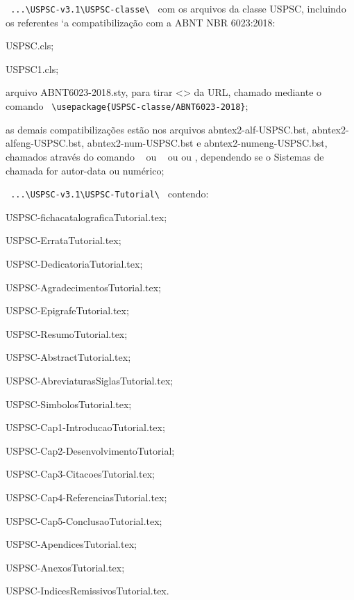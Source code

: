 \begin{alineas}
	\item \verb+ ...\USPSC-v3.1\USPSC-classe\ + com os arquivos da classe USPSC, incluindo os referentes `a compatibilização com a ABNT NBR 6023:2018:
		\begin{alineas}
			\item USPSC.cls;
			\item USPSC1.cls; 
			\item arquivo ABNT6023-2018.sty, para tirar <> da URL, chamado mediante o comando  \verb+ \usepackage{USPSC-classe/ABNT6023-2018}+;
			\item as demais compatibilizações estão nos arquivos abntex2-alf-USPSC.bst, abntex2-alfeng-USPSC.bst, abntex2-num-USPSC.bst e abntex2-numeng-USPSC.bst, chamados atrav\'es do comando \newline \verb+ + ou \newline
			\verb+ + ou \newline
			\verb++ ou \newline \verb++, dependendo se o Sistemas de chamada for autor-data ou num\'erico; 
		\end{alineas}	
	    
	\item \verb+ ...\USPSC-v3.1\USPSC-Tutorial\ + contendo:
		\begin{subalineas}
			\item USPSC-fichacatalograficaTutorial.tex;
			\item USPSC-ErrataTutorial.tex;
			\item USPSC-DedicatoriaTutorial.tex;
			\item USPSC-AgradecimentosTutorial.tex;
			\item USPSC-EpigrafeTutorial.tex;
			\item USPSC-ResumoTutorial.tex;
			\item USPSC-AbstractTutorial.tex;
			\item USPSC-AbreviaturasSiglasTutorial.tex;
			\item USPSC-SimbolosTutorial.tex;
			\item USPSC-Cap1-IntroducaoTutorial.tex;
			\item USPSC-Cap2-DesenvolvimentoTutorial;
			\item USPSC-Cap3-CitacoesTutorial.tex;
			\item USPSC-Cap4-ReferenciasTutorial.tex;
			\item USPSC-Cap5-ConclusaoTutorial.tex;
			\item USPSC-ApendicesTutorial.tex;
			\item USPSC-AnexosTutorial.tex;
			\item USPSC-IndicesRemissivosTutorial.tex.
		\end{subalineas}
	

\end{alineas}
